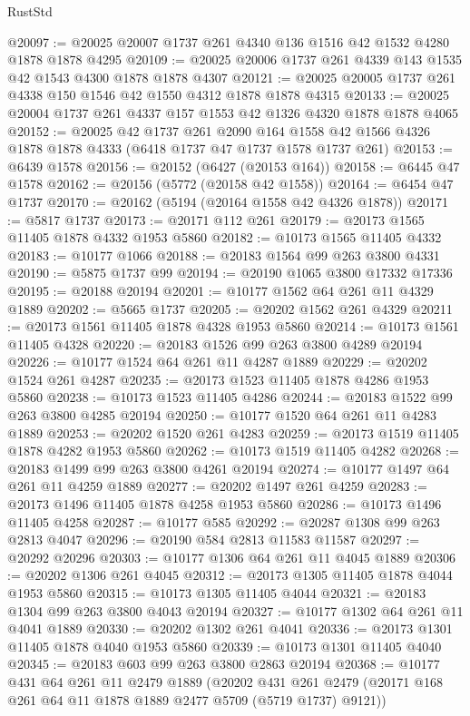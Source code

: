 \begin{lexlean}{RustStd}
\begin{coremodule}
{\begin{coremodule}
{{{{{{{{{{{{{{{{{{{{{{{{{{{{{@20097 := @20025 @20007 @1737 @261 @4340 @136 @1516 @42 @1532 @4280 @1878 @1878 @4295
@20109 := @20025 @20006 @1737 @261 @4339 @143 @1535 @42 @1543 @4300 @1878 @1878 @4307
@20121 := @20025 @20005 @1737 @261 @4338 @150 @1546 @42 @1550 @4312 @1878 @1878 @4315
@20133 := @20025 @20004 @1737 @261 @4337 @157 @1553 @42 @1326 @4320 @1878 @1878 @4065
@20152 := @20025
    @42
    @1737
    @261
    @2090
    @164
    @1558
    @42
    @1566
    @4326
    @1878
    @1878
    @4333
    (@6418 @1737 @47 @1737 @1578 @1737 @261)
@20153 := @6439 @1578
@20156 := @20152 (@6427 (@20153 @164))
@20158 := @6445 @47 @1578
@20162 := @20156 (@5772 (@20158 @42 @1558))
@20164 := @6454 @47 @1737
@20170 := @20162 (@5194 (@20164 @1558 @42 @4326 @1878))
@20171 := @5817 @1737
@20173 := @20171 @112 @261
@20179 := @20173 @1565 @11405 @1878 @4332 @1953 @5860
@20182 := @10173 @1565 @11405 @4332
@20183 := @10177 @1066
@20188 := @20183 @1564 @99 @263 @3800 @4331
@20190 := @5875 @1737 @99
@20194 := @20190 @1065 @3800 @17332 @17336
@20195 := @20188 @20194
@20201 := @10177 @1562 @64 @261 @11 @4329 @1889
@20202 := @5665 @1737
@20205 := @20202 @1562 @261 @4329
@20211 := @20173 @1561 @11405 @1878 @4328 @1953 @5860
@20214 := @10173 @1561 @11405 @4328
@20220 := @20183 @1526 @99 @263 @3800 @4289 @20194
@20226 := @10177 @1524 @64 @261 @11 @4287 @1889
@20229 := @20202 @1524 @261 @4287
@20235 := @20173 @1523 @11405 @1878 @4286 @1953 @5860
@20238 := @10173 @1523 @11405 @4286
@20244 := @20183 @1522 @99 @263 @3800 @4285 @20194
@20250 := @10177 @1520 @64 @261 @11 @4283 @1889
@20253 := @20202 @1520 @261 @4283
@20259 := @20173 @1519 @11405 @1878 @4282 @1953 @5860
@20262 := @10173 @1519 @11405 @4282
@20268 := @20183 @1499 @99 @263 @3800 @4261 @20194
@20274 := @10177 @1497 @64 @261 @11 @4259 @1889
@20277 := @20202 @1497 @261 @4259
@20283 := @20173 @1496 @11405 @1878 @4258 @1953 @5860
@20286 := @10173 @1496 @11405 @4258
@20287 := @10177 @585
@20292 := @20287 @1308 @99 @263 @2813 @4047
@20296 := @20190 @584 @2813 @11583 @11587
@20297 := @20292 @20296
@20303 := @10177 @1306 @64 @261 @11 @4045 @1889
@20306 := @20202 @1306 @261 @4045
@20312 := @20173 @1305 @11405 @1878 @4044 @1953 @5860
@20315 := @10173 @1305 @11405 @4044
@20321 := @20183 @1304 @99 @263 @3800 @4043 @20194
@20327 := @10177 @1302 @64 @261 @11 @4041 @1889
@20330 := @20202 @1302 @261 @4041
@20336 := @20173 @1301 @11405 @1878 @4040 @1953 @5860
@20339 := @10173 @1301 @11405 @4040
@20345 := @20183 @603 @99 @263 @3800 @2863 @20194
@20368 := @10177
    @431
    @64
    @261
    @11
    @2479
    @1889
    (@20202 @431 @261 @2479 (@20171 @168 @261 @64 @11 @1878 @1889 @2477 @5709 (@5719 @1737) @9121))
}}}}}}}}}}}}}}}}}}}}}}}}}}}}}
\end{coremodule}}
\end{coremodule}
\end{lexlean}
